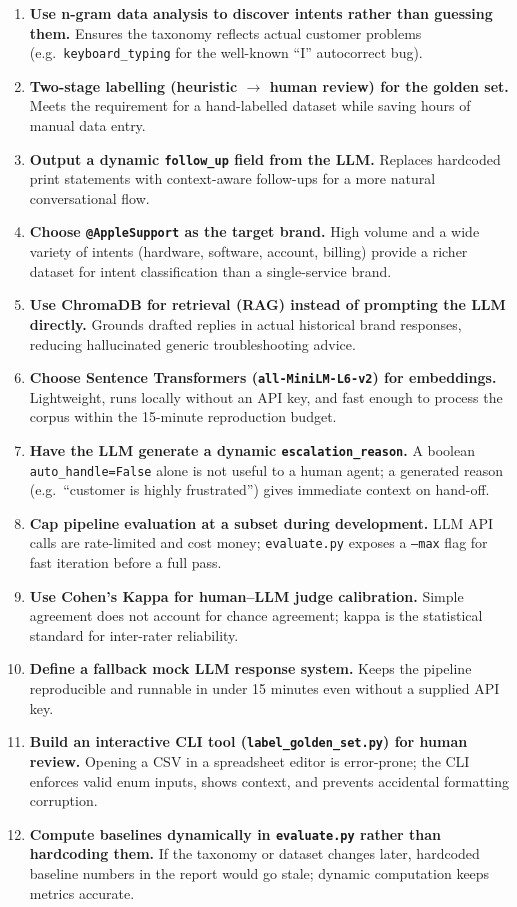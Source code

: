 \documentclass[11pt]{article}
\begin{document}
\begin{enumerate}
  \item \textbf{Use n-gram data analysis to discover intents rather than guessing them.} Ensures the taxonomy reflects actual customer problems (e.g.\ \texttt{keyboard\_typing} for the well-known ``I'' autocorrect bug).
  \item \textbf{Two-stage labelling (heuristic $\rightarrow$ human review) for the golden set.} Meets the requirement for a hand-labelled dataset while saving hours of manual data entry.
  \item \textbf{Output a dynamic \texttt{follow\_up} field from the LLM.} Replaces hardcoded print statements with context-aware follow-ups for a more natural conversational flow.
  \item \textbf{Choose \texttt{@AppleSupport} as the target brand.} High volume and a wide variety of intents (hardware, software, account, billing) provide a richer dataset for intent classification than a single-service brand.
  \item \textbf{Use ChromaDB for retrieval (RAG) instead of prompting the LLM directly.} Grounds drafted replies in actual historical brand responses, reducing hallucinated generic troubleshooting advice.
  \item \textbf{Choose Sentence Transformers (\texttt{all-MiniLM-L6-v2}) for embeddings.} Lightweight, runs locally without an API key, and fast enough to process the corpus within the 15-minute reproduction budget.
  \item \textbf{Have the LLM generate a dynamic \texttt{escalation\_reason}.} A boolean \texttt{auto\_handle=False} alone is not useful to a human agent; a generated reason (e.g.\ ``customer is highly frustrated'') gives immediate context on hand-off.
  \item \textbf{Cap pipeline evaluation at a subset during development.} LLM API calls are rate-limited and cost money; \texttt{evaluate.py} exposes a \texttt{--max} flag for fast iteration before a full pass.
  \item \textbf{Use Cohen's Kappa for human--LLM judge calibration.} Simple agreement does not account for chance agreement; kappa is the statistical standard for inter-rater reliability.
  \item \textbf{Define a fallback mock LLM response system.} Keeps the pipeline reproducible and runnable in under 15 minutes even without a supplied API key.
  \item \textbf{Build an interactive CLI tool (\texttt{label\_golden\_set.py}) for human review.} Opening a CSV in a spreadsheet editor is error-prone; the CLI enforces valid enum inputs, shows context, and prevents accidental formatting corruption.
  \item \textbf{Compute baselines dynamically in \texttt{evaluate.py} rather than hardcoding them.} If the taxonomy or dataset changes later, hardcoded baseline numbers in the report would go stale; dynamic computation keeps metrics accurate.
\end{enumerate}
\end{document}
